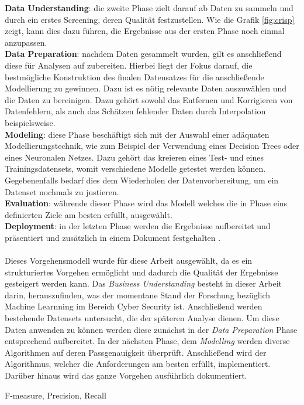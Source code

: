 \documentclass[
    12pt, %
    DIV10,
    ngerman, %
    a4paper, %
    oneside, %
    titlepage, %
    parskip=half, %
    headings=normal, %
    listof=totoc, %
    bibliography=totoc, %
    index=totoc, %
    captions=tableheading, %
    final %
]{scrreprt}
\begin{document}
\textbf{Data Understanding}: die zweite Phase zielt darauf ab Daten zu sammeln und durch ein erstes Screening, deren Qualität festzustellen. Wie die Grafik \ref{fig:crisp} zeigt, kann dies dazu führen, die Ergebnisse aus der ersten Phase noch einmal anzupassen.\\ 
\textbf{Data Preparation}: nachdem Daten gesammelt wurden, gilt es anschließend diese für Analysen auf zubereiten. Hierbei liegt der Fokus darauf, die bestmögliche Konstruktion des finalen Datensatzes für die anschließende Modellierung zu gewinnen. Dazu ist es nötig relevante Daten auszuwählen und die Daten zu bereinigen. Dazu gehört sowohl das Entfernen und Korrigieren von Datenfehlern, als auch das Schätzen fehlender Daten durch Interpolation beispielsweise.\\
\textbf{Modeling}: diese Phase beschäftigt sich mit der Auswahl einer adäquaten Modellierungstechnik, wie zum Beispiel der Verwendung eines Decision Trees oder eines Neuronalen Netzes. Dazu gehört das kreieren eines Test- und eines Trainingsdatensets, womit verschiedene Modelle getestet werden können. Gegebenenfalls bedarf dies dem Wiederholen der Datenvorbereitung, um ein Datenset nochmals zu justieren.\\
\textbf{Evaluation}: währende dieser Phase wird das Modell welches die in Phase eins definierten Ziele am besten erfüllt, ausgewählt.\\
\textbf{Deployment}: in der letzten Phase werden die Ergebnisse aufbereitet und präsentiert und zusätzlich in einem Dokument festgehalten \parencite{SmartVisionEurop}.\\\\
Dieses Vorgehensmodell wurde für diese Arbeit ausgewählt, da es ein strukturiertes Vorgehen ermöglicht und dadurch die Qualität der Ergebnisse gesteigert werden kann. Das \emph{Business Understanding} besteht in dieser Arbeit darin, herauszufinden, was der momentane Stand der Forschung bezüglich Machine Learnning im Bereich Cyber Security ist. Anschließend werden bestehende Datensets untersucht, die der späteren Analyse dienen.
Um diese Daten anwenden zu können werden diese zunächst in der \emph{Data Preparation} Phase entsprechend aufbereitet. In der nächsten Phase, dem \emph{Modelling} werden diverse Algorithmen auf deren Passgenauigkeit überprüft. Anschließend wird der Algorithmus, welcher die Anforderungen am besten erfüllt, implementiert. Darüber hinaus wird das ganze Vorgehen ausführlich dokumentiert.

F-measure, Precision, Recall
\end{document}
